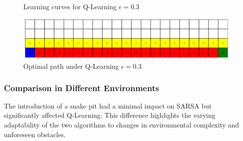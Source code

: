\documentclass[12pt]{article}
\begin{document}
\begin{figure}[ht]
\begin{minipage}[b]{0.48\textwidth}
        \caption{\scriptsize Learning curves for Q-Learning \(\epsilon=0.3\)}
        \includegraphics[width=\textwidth]{image/R2.4.png}
        \caption{\scriptsize Optimal path under Q-Learning \(\epsilon=0.3\)}
    \end{minipage}
\end{figure}

\subsubsection{Comparison in Different Environments}
The introduction of a snake pit had a minimal impact on SARSA but significantly affected Q-Learning. This difference highlights the varying adaptability of the two algorithms to changes in environmental complexity and unforeseen obstacles.
\end{document}
